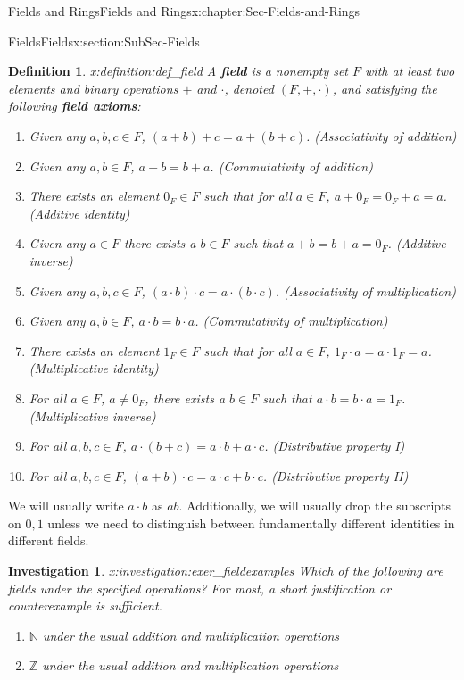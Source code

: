 \documentclass[oneside,10pt,]{book}
\newcommand{\terminology}[1]{\textbf{#1}}
\numberwithin{equation}{section}
\def\Z{{\mathbb Z}}
\def\N{{\mathbb N}}
\newtheorem{definition}[theorem]{Definition}
\newtheorem{investigation}[theorem]{Investigation}
\begin{document}
\begin{chapterptx}{Fields and Rings}{}{Fields and Rings}{}{}{x:chapter:Sec-Fields-and-Rings}
\begin{sectionptx}{Fields}{}{Fields}{}{}{x:section:SubSec-Fields}
\begin{definition}{}{x:definition:def_field}%
%
A \terminology{field} is a nonempty set \(F\) with at least two elements and binary operations \(+\) and \(\cdot\), denoted \((F,+,\cdot)\), and satisfying the following \terminology{field axioms}:%
\begin{enumerate}
\item{}Given any \(a,b,c\in F\), \((a+b)+c = a+(b+c)\). (Associativity of addition)%
\item{}Given any \(a,b\in F\), \(a+b= b+a\). (Commutativity of addition)%
\item{}There exists an element \(0_F\in F\) such that for all \(a\in F\), \(a+0_F = 0_F + a = a\). (Additive identity)%
\item{}Given any \(a\in F\) there exists a \(b\in F\) such that \(a+b = b + a =0_F\). (Additive inverse)%
\item{}Given any \(a,b,c\in F\), \((a\cdot b)\cdot c = a\cdot (b\cdot c)\). (Associativity of multiplication)%
\item{}Given any \(a,b\in F\), \(a\cdot b = b\cdot a\). (Commutativity of multiplication)%
\item{}There exists an element \(1_F\in F\) such that for all \(a\in F\), \(1_F\cdot a = a\cdot 1_F = a\). (Multiplicative identity)%
\item{}For all \(a\in F\), \(a\ne 0_F\), there exists a \(b\in F\) such that \(a\cdot b = b\cdot a = 1_F\). (Multiplicative inverse)%
\item{}For all \(a,b,c\in F\), \(a\cdot (b+c) = a\cdot b + a\cdot c\). (Distributive property I)%
\item{}For all \(a,b,c\in F\), \((a+b)\cdot c = a\cdot c + b\cdot c\). (Distributive property II)%
\end{enumerate}
%
\end{definition}
We will usually write \(a\cdot b\) as \(ab\). Additionally, we will usually drop the subscripts on \(0,1\) unless we need to distinguish between fundamentally different identities in different fields.%
\begin{investigation}{}{x:investigation:exer_fieldexamples}%
Which of the following are fields under the specified operations? For most, a short justification or counterexample is sufficient.%
\begin{enumerate}
\item{}\(\N\) under the usual addition and multiplication operations%
\item{}\(\Z\) under the usual addition and multiplication operations%

\end{enumerate}
\end{investigation}
\end{sectionptx}
\end{chapterptx}
\end{document}
